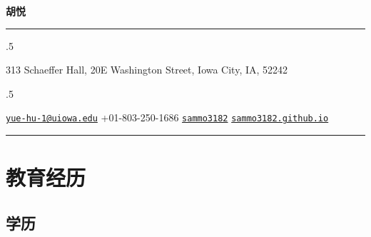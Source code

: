 \documentclass[10.5pt,]{article}
\begin{document}
\centerline{\huge \bf 胡悦}

\vspace{2 mm}

\hrule

\vspace{2 mm}


\moveleft.5\hoffset\centerline{313 Schaeffer Hall, 20E Washington Street, Iowa City, IA, 52242}
\moveleft.5\hoffset\centerline{ \faEnvelopeO \hspace{1 mm} \href{mailto:}{\tt \href{mailto:yue-hu-1@uiowa.edu}{\nolinkurl{yue-hu-1@uiowa.edu}}} \hspace{1 mm}  \faPhone \hspace{1 mm}  +01-803-250-1686  \hspace{1 mm}  \faGithub \hspace{1 mm} \href{http://github.com/sammo3182}{\tt sammo3182} \hspace{1 mm}    \faGlobe \hspace{1 mm} \href{http://sammo3182.github.io}{\tt sammo3182.github.io}   }

\vspace{2 mm}

\hrule


\section{教育经历}

\subsection{学历}
\end{document}
